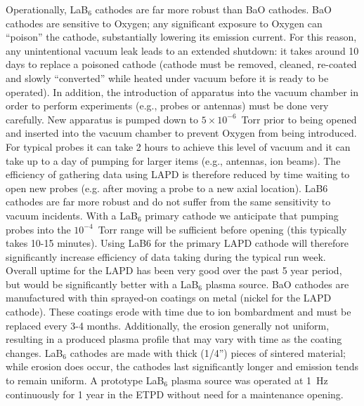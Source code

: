 \documentclass[11pt]{article}
\begin{document}
Operationally, LaB$_6$ cathodes are far more robust than BaO cathodes.
BaO cathodes are sensitive to Oxygen; any significant exposure to
Oxygen can ``poison'' the cathode, substantially lowering its
emission current. For this reason, any unintentional vacuum leak leads
to an extended shutdown: it takes around 10 days to replace a poisoned
cathode (cathode must be removed, cleaned, re-coated and slowly
``converted'' while heated under vacuum before it is ready to be
operated). In addition, the introduction of apparatus into the vacuum
chamber in order to perform experiments (e.g., probes or antennas) must
be done very carefully. New apparatus is pumped down to $5\times
10^{-6}$~Torr prior to being opened and inserted into the vacuum
chamber to prevent Oxygen from being introduced. For typical probes it
can take 2 hours to achieve this level of vacuum and it can take up to
a day of pumping for larger items (e.g., antennas, ion beams). The
efficiency of gathering data using LAPD is therefore reduced by time
waiting to open new probes (e.g.  after moving a probe to a new axial
location). LaB6 cathodes are far more robust and do not suffer from
the same sensitivity to vacuum incidents.  With a LaB$_6$ primary
cathode we anticipate that pumping probes into the $10^{-4}$~Torr
range will be sufficient before opening (this typically takes 10-15
minutes).  Using LaB6 for the primary LAPD cathode will therefore
significantly increase efficiency of data taking during the typical
run week. Overall uptime for the LAPD has been very good over the past
5 year period, but would be significantly better with a LaB$_6$ plasma
source. BaO cathodes are manufactured with thin sprayed-on coatings on
metal (nickel for the LAPD cathode).  These coatings erode with time
due to ion bombardment and must be replaced every 3-4 months.
Additionally, the erosion generally not uniform, resulting in a
produced plasma profile that may vary with time as the coating
changes.  LaB$_6$ cathodes are made with thick (1/4'') pieces of
sintered material; while erosion does occur, the cathodes last
significantly longer and emission tends to remain uniform. A prototype
LaB$_6$ plasma source was operated at 1~Hz continuously for 1 year in
the ETPD without need for a maintenance opening.
\end{document}
